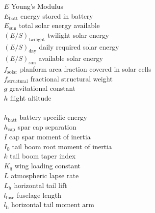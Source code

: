 \begin{multicols}{2}
\begin{tabbing}
$E$ \> Young's Modulus \\ %
$E_{\text{batt}}$ \> energy stored in battery \\ %
$E_{\text{sun}}$ \> total solar energy available \\ %
$(E/S)_{\text{twilight}}$ \> twilight solar energy \\ %
$(E/S)_{\text{day}}$ \> daily required solar energy \\ %
$(E/S)_{\text{sun}}$ \> available solar energy \\ %
$f_{\text{solar}}$ \> planform area fraction covered in solar cells \\
$f_{\text{structural}}$ \> fractional structural weight\\
$g$ \> gravitational constant \\ %
$h$ \> flight altitude \\ %
\DIFaddbegin {}\\ %
\DIFaddend $h_{\text{batt}}$ \> battery specific energy \\ %
$h_{\text{cap}}$ \> spar cap separation \\ %
$I$ \> cap spar moment of inertia \\ %
$I_0$ \> tail boom root moment of inertia \\ %
$k$ \> tail boom taper index \\
$K_q$ \> wing loading constant \\ %
$L$ \> atmospheric lapse rate \\ %
$L_\text{h}$ \> horizontal tail lift \\ %
$l_\text{fuse}$ \> fuselage length \\ %
$l_\text{h}$ \> horizontal tail moment arm \\ %

\end{tabbing}
\end{multicols}
